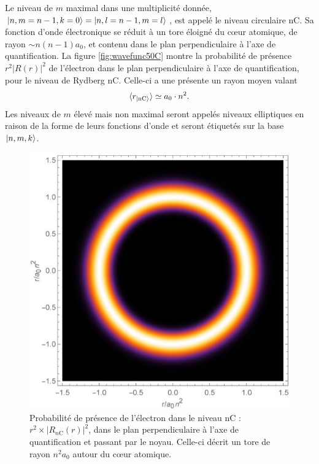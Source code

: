 Le niveau de $m$ maximal dans une multiplicité donnée, $\ket{n,m=n-1,k=0} =\ket{n,l=n-1,m=l}$, est appelé le niveau circulaire nC.
Sa fonction d'onde électronique se réduit à un tore éloigné du c\oe ur atomique, de rayon $\sim n(n-1)a_0$, et contenu dans le plan perpendiculaire à l'axe de quantification.
La figure \eqref{fig:wavefunc50C} montre la probabilité de présence $r^2|R(r)|^2$ de l'électron dans le plan perpendiculaire à l'axe de quantification, pour le niveau de Rydberg nC. Celle-ci a une présente un rayon moyen valant
\begin{equation}\label{eq:rayon_nC}
\braket{r_{\ket{\mathrm{nC}}}}\simeq  a_0 \cdot n^2.
\end{equation}
Les niveaux de $m$ élevé mais non maximal seront appelés niveaux elliptiques en raison de la forme de leurs fonctions d'onde et seront étiquetés sur la base $\ket{n,m,k}$.
\begin{figure}[!h]
	\centering
	\includegraphics[width=0.5\linewidth]{figures/theory/WaveFunc_50C_}
	\caption[Fonction d'onde du niveau nC]{Probabilité de présence de l'électron dans le niveau nC : $r^2\times |R_{n\mathrm{C}}(r)|^2$, dans le plan perpendiculaire à l'axe de quantification et passant par le noyau.
	Celle-ci décrit un tore de rayon $n^2a_0$ autour du c\oe ur atomique.}
	\label{fig:wavefunc50C}
\end{figure}

